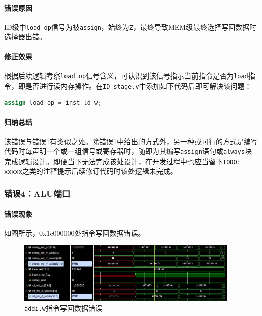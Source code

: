 \documentclass[UTF-8,twoside,c5size]{ctexart}
\begin{document}
	\paragraph{错误原因}\hfill
	
	ID级中\texttt{load\_op}信号为被\texttt{assign}，始终为\texttt{Z}，最终导致MEM级最终选择写回数据时选择器出错。
	
	\paragraph{修正效果}\hfill
	
	根据后续逻辑考察\texttt{load\_op}信号含义，可认识到该信号指示当前指令是否为\texttt{load}指令，即是否进行读内存操作。在\texttt{ID\_stage.v}中添加如下代码后即可解决该问题：
	\begin{lstlisting}[language=verilog]
	assign load_op = inst_ld_w;
	\end{lstlisting}

	\paragraph{归纳总结}\hfill
	
	该错误与错误1有类似之处。除错误1中给出的方式外，另一种或可行的方式是编写代码时每声明一个或一组信号或寄存器时，随即为其编写\texttt{assign}语句或\texttt{always}块完成逻辑设计。即便当下无法完成该处设计，在开发过程中也应当留下\texttt{TODO: xxxxx}之类的注释提示后续修订代码时该处逻辑未完成。
	
	\subsubsection{错误\textbf{4：}ALU端口}
	
	\paragraph{错误现象}\hfill
	
	如图所示，0x1c000000处指令写回数据错误。
	
	\begin{figure}[!h]
		\centering
		\includegraphics*[width=0.95\textwidth]{03-dbg-04.jpg}
		\caption{\texttt{addi.w}指令写回数据错误}
	\end{figure}
\end{document}
